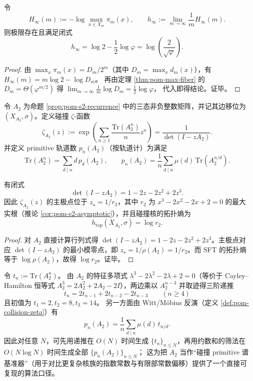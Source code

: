 \begin{corollary}\label{cor:pom-min-entropy-rate}
令
\[
H_\infty(m):=-\log\max_{x\in X_m}\pi_m(x),
\qquad
h_\infty:=\lim_{m\to\infty}\frac{1}{m}H_\infty(m).
\]
则极限存在且满足闭式
\[
\boxed{\;
h_\infty=\log 2-\frac{1}{2}\log\varphi=\log\!\left(\frac{2}{\sqrt{\varphi}}\right).\;}
\]
\end{corollary}
\begin{proof}
由 \(\max_x\pi_m(x)=D_m/2^m\)（其中 \(D_m=\max_x d_m(x)\)），有
\(
H_\infty(m)=m\log 2-\log D_m
\)。
再由定理 \ref{thm:pom-max-fiber} 的 \(D_m=\Theta(\varphi^{m/2})\) 得
\(
\lim_{m\to\infty}\frac{1}{m}\log D_m=\frac{1}{2}\log\varphi
\)，
代入即得结论。证毕。
\end{proof}

\begin{definition}\label{def:pom-collision-zeta}
令 \(A_2\) 为命题 \ref{prop:pom-s2-recurrence} 中的三态非负整数矩阵，并记其边移位为 \((X_{A_2},\sigma)\)。定义碰撞 \(\zeta\)-函数
$$
\zeta_{A_2}(z):=\exp\!\left(\sum_{n\ge 1}\frac{\mathrm{Tr}(A_2^n)}{n}z^n\right)
=\frac{1}{\det(I-zA_2)}.
$$
并定义 primitive 轨道数 \(p_n(A_2)\)（按轨道计）为满足
$$
\mathrm{Tr}(A_2^n)=\sum_{d\mid n} d\,p_d(A_2),
\qquad
p_n(A_2)=\frac{1}{n}\sum_{d\mid n}\mu(d)\,\mathrm{Tr}(A_2^{n/d}).
$$
\end{definition}




\begin{proposition}[碰撞核的行列式与主极点]\label{prop:pom-collision-det}
有闭式
$$
\det(I-zA_2)=1-2z-2z^2+2z^3.
$$
因此 \(\zeta_{A_2}(z)\) 的主极点位于 \(z_\star=1/r_2\)，其中 \(r_2\) 为 \(x^3-2x^2-2x+2=0\) 的最大实根（推论 \ref{cor:pom-s2-asymptotic}），并且碰撞核的拓扑熵为
$$
h_{\mathrm{top}}(X_{A_2},\sigma)=\log r_2.
$$
\end{proposition}
\begin{proof}
对 \(A_2\) 直接计算行列式得 \(\det(I-zA_2)=1-2z-2z^2+2z^3\)。主极点对应 \(\det(I-zA_2)\) 的最小模零点，即 \(z_\star=1/\rho(A_2)=1/r_2\)。而 SFT 的拓扑熵等于 \(\log\rho(A_2)\)，故得 \(\log r_2\)。证毕。
\end{proof}

\begin{remark}\label{rem:pom-a2-primitive-fast}
令 \(t_n:=\mathrm{Tr}(A_2^n)\)。
由 \(A_2\) 的特征多项式 \(\lambda^3-2\lambda^2-2\lambda+2=0\)（等价于 Cayley--Hamilton 恒等式 \(A_2^3=2A_2^2+2A_2-2I\)），两边乘以 \(A_2^{n-3}\) 并取迹得三阶递推
\[
\boxed{\;
t_n=2t_{n-1}+2t_{n-2}-2t_{n-3}\qquad(n\ge 4)\;}
\]
且初值为 \(t_1=2,t_2=8,t_3=14\)。
另一方面由 Witt/Möbius 反演（定义 \ref{def:pom-collision-zeta}）有
\[
p_n(A_2)=\frac{1}{n}\sum_{d\mid n}\mu(d)\,t_{n/d}.
\]
因此对任意 \(N\)，可先用递推在 \(O(N)\) 时间生成 \(\{t_n\}_{n\le N}\)，再用约数和的筛法在 \(O(N\log N)\) 时间生成全部 \(\{p_n(A_2)\}_{n\le N}\)；
这为把 \(A_2\) 当作“碰撞 primitive 谱基准器”（用于对比更复杂核族的指数常数与有限部常数偏移）提供了一个直接可复现的算法口径。
\end{remark}


